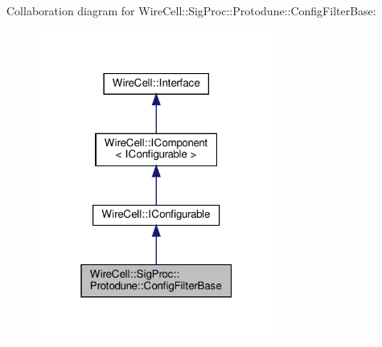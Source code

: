 Collaboration diagram for Wire\+Cell\+:\+:Sig\+Proc\+:\+:Protodune\+:\+:Config\+Filter\+Base\+:
\nopagebreak
\begin{figure}[H]
\begin{center}
\leavevmode
\includegraphics[width=220pt]{class_wire_cell_1_1_sig_proc_1_1_protodune_1_1_config_filter_base__coll__graph}
\end{center}
\end{figure}

